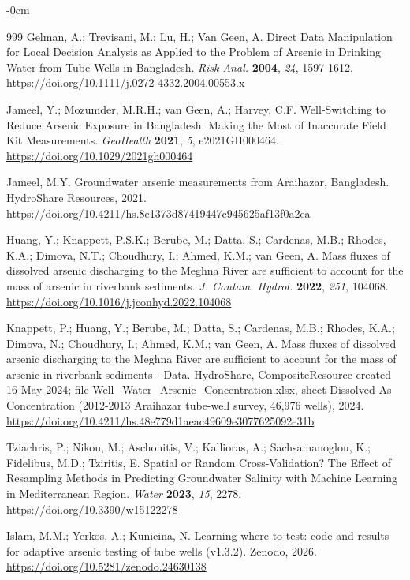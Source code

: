 \documentclass[sustainability,article,submit,pdftex,moreauthors]{Definitions/mdpi}
\begin{document}
\begin{adjustwidth}{-\extralength}{0cm}
\begin{thebibliography}{999}
Gelman, A.; Trevisani, M.; Lu, H.; Van Geen, A. Direct Data Manipulation for Local Decision Analysis as Applied to the Problem of Arsenic in Drinking Water from Tube Wells in Bangladesh. \textit{Risk Anal.} \textbf{2004}, \textit{24}, 1597-1612. \url{https://doi.org/10.1111/j.0272-4332.2004.00553.x}

Jameel, Y.; Mozumder, M.R.H.; van Geen, A.; Harvey, C.F. Well‐Switching to Reduce Arsenic Exposure in Bangladesh: Making the Most of Inaccurate Field Kit Measurements. \textit{GeoHealth} \textbf{2021}, \textit{5}, e2021GH000464. \url{https://doi.org/10.1029/2021gh000464}

Jameel, M.Y. Groundwater arsenic measurements from Araihazar, Bangladesh. HydroShare Resources, 2021. \url{https://doi.org/10.4211/hs.8e1373d87419447c945625af13f0a2ea}

Huang, Y.; Knappett, P.S.K.; Berube, M.; Datta, S.; Cardenas, M.B.; Rhodes, K.A.; Dimova, N.T.; Choudhury, I.; Ahmed, K.M.; van Geen, A. Mass fluxes of dissolved arsenic discharging to the Meghna River are sufficient to account for the mass of arsenic in riverbank sediments. \textit{J. Contam. Hydrol.} \textbf{2022}, \textit{251}, 104068. \url{https://doi.org/10.1016/j.jconhyd.2022.104068}

Knappett, P.; Huang, Y.; Berube, M.; Datta, S.; Cardenas, M.B.; Rhodes, K.A.; Dimova, N.; Choudhury, I.; Ahmed, K.M.; van Geen, A. Mass fluxes of dissolved arsenic discharging to the Meghna River are sufficient to account for the mass of arsenic in riverbank sediments - Data. HydroShare, CompositeResource created 16 May 2024; file Well\_Water\_Arsenic\_Concentration.xlsx, sheet Dissolved As Concentration (2012-2013 Araihazar tube-well survey, 46,976 wells), 2024. \url{https://doi.org/10.4211/hs.48e779d1aeac49609e3077625092e31b}

Tziachris, P.; Nikou, M.; Aschonitis, V.; Kallioras, A.; Sachsamanoglou, K.; Fidelibus, M.D.; Tziritis, E. Spatial or Random Cross-Validation? The Effect of Resampling Methods in Predicting Groundwater Salinity with Machine Learning in Mediterranean Region. \textit{Water} \textbf{2023}, \textit{15}, 2278. \url{https://doi.org/10.3390/w15122278}

Islam, M.M.; Yerkos, A.; Kunicina, N. Learning where to test: code and results for adaptive arsenic testing of tube wells (v1.3.2). Zenodo, 2026. \url{https://doi.org/10.5281/zenodo.24630138}

\end{thebibliography}
\end{adjustwidth}
\end{document}
